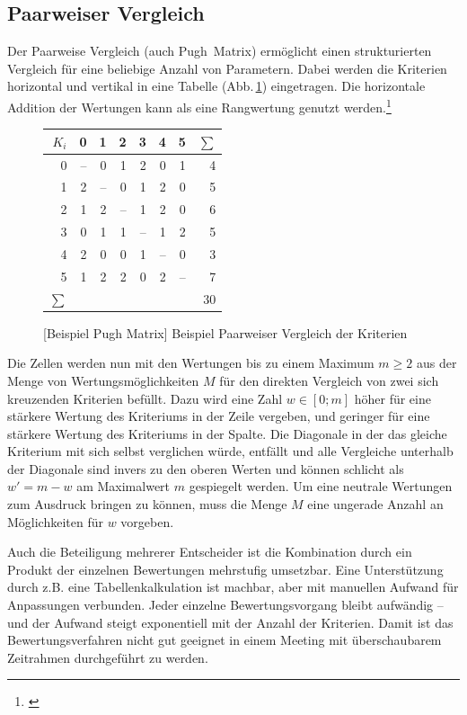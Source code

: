 \subsection{Paarweiser Vergleich}\label{dep:pugh}

Der Paarweise Vergleich (auch Pugh~Matrix) ermöglicht einen strukturierten Vergleich für eine beliebige Anzahl von Parametern.
Dabei werden die Kriterien horizontal und vertikal in eine Tabelle (Abb.\,\ref{abb:pugh-matrix}) eingetragen.
Die horizontale Addition der Wertungen kann als eine Rangwertung genutzt werden.\footnote{\cite{TN_libero_mab21000123709}}

\begin{figure}[!htp]
\centering
\begin{tabular}{|r||r|r|r|r|r|r||r|}
\hline
\(K_i\)	& 0 	& 1 	& 2 	& 3 	& 4 	& 5	& \(\sum{}\)\\
\hline \hline
0		& --	& 0		& 1		& 2		& 0		& 1	& 4			\\
\hline
1		& 2		& --	& 0		& 1		& 2		& 0	& 5			\\
\hline
2		& 1		& 2		& --	& 1		& 2		& 0	& 6			\\
\hline
3		& 0		& 1		& 1		& --	& 1		& 2	& 5			\\
\hline
4		& 2		& 0		& 0		& 1		& --	& 0	& 3			\\
\hline
5		& 1		& 2		& 2		& 0		& 2		& --& 7			\\
\hline \hline
\(\sum{}\) & \multicolumn{6}{r||}{} & {30} \\
\hline
\end{tabular}
[Beispiel Pugh Matrix]{\label{abb:pugh-matrix} Beispiel Paarweiser Vergleich der Kriterien}
\end{figure}

Die Zellen werden nun mit den Wertungen bis zu einem Maximum \(m \ge 2\) aus der Menge von Wertungsmöglichkeiten \(M\) für den direkten Vergleich von zwei sich kreuzenden Kriterien befüllt.
Dazu wird eine Zahl \(w \in [0;m] \)  höher für eine stärkere Wertung des Kriteriums in der Zeile vergeben, und geringer für eine stärkere Wertung des Kriteriums in der Spalte.
Die Diagonale in der das gleiche Kriterium mit sich selbst verglichen würde, entfällt und alle Vergleiche unterhalb der Diagonale sind invers zu den oberen Werten und können schlicht als \(w' = m - w\) am Maximalwert \(m\) gespiegelt werden.
Um eine neutrale Wertungen zum Ausdruck bringen zu können, muss die Menge \(M\) eine ungerade Anzahl an Möglichkeiten für \(w\) vorgeben.

Auch die Beteiligung mehrerer Entscheider ist die Kombination durch ein Produkt der einzelnen Bewertungen mehrstufig umsetzbar.
Eine Unterstützung durch z.B. eine Tabellenkalkulation ist machbar, aber mit manuellen Aufwand für Anpassungen verbunden.
Jeder einzelne Bewertungsvorgang bleibt aufwändig -- und der Aufwand steigt exponentiell mit der Anzahl der Kriterien.
Damit ist das Bewertungsverfahren nicht gut geeignet in einem Meeting mit überschaubarem Zeitrahmen durchgeführt zu werden.

